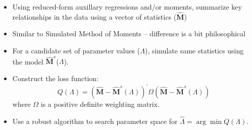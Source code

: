 \documentclass[notes=show]{beamer}
\begin{document}
\begin{frame}%



\begin{itemize}
\item Using reduced-form auxillary regressions and/or moments, summarize key
relationships in the data using a vector of statistics ($\widehat{\mathbf{M}}
$)

\item Similar to Simulated Method of Moments -- difference is a bit philosophical 

\item For a candidate set of parameter values ($\Lambda $), simulate same
statistics using the model $\widehat{\mathbf{M}}^{s}$($\Lambda $).

\item Construct the loss function: 
\[
Q(\Lambda )=\left( \widehat{\mathbf{M}}-\widehat{\mathbf{M}}^{s}(\Lambda
)\right) ^{\prime }\Omega \left( \widehat{\mathbf{M}}-\widehat{\mathbf{M}}%
^{s}(\Lambda )\right) 
\]%
where $\Omega $ is a positive definite weighting matrix.

\item Use a robust algorithm to search parameter space for $\widehat{\Lambda 
}=\arg \min Q(\Lambda ).$
\end{itemize}

\end{frame}%
\end{document}

